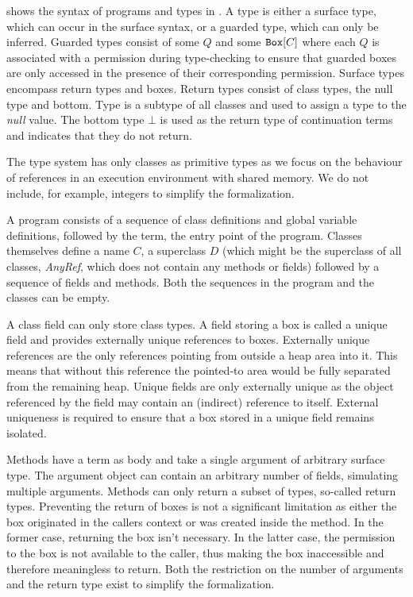  shows the syntax of programs and types in \plc.
A type is either a surface type, which can occur in the surface syntax, or a guarded type, which can only be inferred. Guarded types consist of some $Q$ and some $\texttt{Box}[C]$ where each $Q$ is associated with a permission during type-checking to ensure that guarded boxes are only accessed in the presence of their corresponding permission. Surface types encompass return types and boxes. Return types consist of class types, the null type and bottom.
Type  is a subtype of all classes and used to assign a type to the \textit{null} value.
The bottom type $\bot$ is used as the return type of continuation terms and indicates that they do not return.

The type system has only classes as primitive types as we focus on the behaviour of references in an execution environment with shared memory. We do not include, for example, integers to simplify the formalization.

A program consists of a sequence of class definitions and global variable definitions, followed by the  term, the entry point of the program. Classes themselves define a name $C$, a superclass $D$ (which might be the superclass of all classes, \textit{AnyRef}, which does not contain any methods or fields) followed by a sequence of fields and methods. Both the sequences in the program and the classes can be empty.

A class field can only store class types. A field storing a box is called a unique field and provides externally unique references to boxes. Externally unique references are the only references pointing from outside a heap area into it. This means that without this reference the pointed-to area would be fully separated from the remaining heap. Unique fields are only externally unique as the object referenced by the field may contain an (indirect) reference to itself. External uniqueness is required to ensure that a box stored in a unique field remains isolated.

Methods have a term as body and take a single argument of arbitrary surface type. The argument object can contain an arbitrary number of fields, simulating multiple arguments.
Methods can only return a subset of types, so-called return types. 
Preventing the return of boxes is not a significant limitation as either the box originated in the callers context or was created inside the method.
In the former case, returning the box isn't necessary.
In the latter case, the permission to the box is not available to the caller, thus making the box inaccessible and therefore meaningless to return.
Both the restriction on the number of arguments and the return type exist to simplify the formalization.

